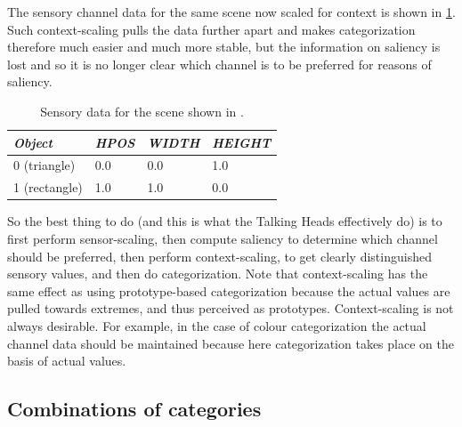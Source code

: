 The sensory channel data for the 
same scene now scaled for context is shown in \ref{tab:t-game22scaled}. Such context-scaling 
pulls the data further apart and makes categorization 
therefore much easier and much more 
stable, but the information on saliency is lost and so 
it is no longer clear which channel is to be preferred
for reasons of saliency. 
\begin{table}
\begin{center}
\begin{tabular}{ l  l  l  l } \hline
{\it Object} & {\it HPOS} & {\it WIDTH} & {\it HEIGHT} \\ \hline
0 (triangle) & 0.0 & 0.0 & 1.0  \\ \hline
1 (rectangle) & 1.0 & 1.0 & 0.0 \\ \hline 
\end{tabular}
\caption{\label{tab:t-game22scaled} Sensory data for the scene shown in .}
\end{center}
\end{table}
So the best thing to do (and this is what the Talking Heads 
effectively do) is to first perform sensor-scaling, then 
compute saliency to determine which channel should be 
preferred, then perform context-scaling, to get clearly 
distinguished sensory values, and then do categorization. 
Note that context-scaling has the same effect as using 
prototype-based categorization because the actual values 
are pulled towards extremes, and thus perceived as 
prototypes. Context-scaling is not always desirable. For example, 
in the case of colour categorization the actual channel
data should be maintained because here categorization 
takes place on the basis of actual values. 

\subsection{Combinations of categories}

